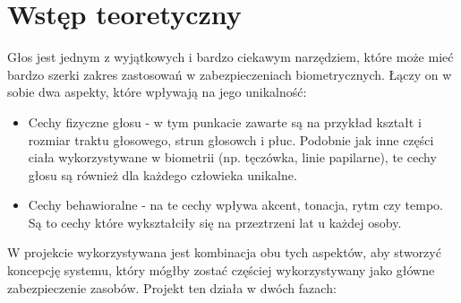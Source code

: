 \section{Wstęp teoretyczny}

Głos jest jednym z wyjątkowych i bardzo ciekawym narzędziem, które może mieć bardzo szerki zakres zastosowań w zabezpieczeniach biometrycznych. Łączy on w sobie dwa aspekty, które wpływają na jego unikalność:

\begin{itemize}
	\item Cechy fizyczne głosu - w tym punkacie zawarte są na przykład kształt i rozmiar traktu głosowego, strun głosowch i płuc. Podobnie jak inne części ciała wykorzystywane w biometrii (np. tęczówka, linie papilarne), te cechy głosu są również dla każdego człowieka unikalne.
	\item Cechy behawioralne - na te cechy wpływa akcent, tonacja, rytm czy tempo. Są to cechy które wykształciły się na przeztrzeni lat u każdej osoby.
\end{itemize}
W projekcie wykorzystywana jest kombinacja obu tych aspektów, aby stworzyć koncepcję systemu, który mógłby zostać częściej wykorzystywany jako główne zabezpieczenie zasobów.
\newline
\newline
Projekt ten działa w dwóch fazach:


